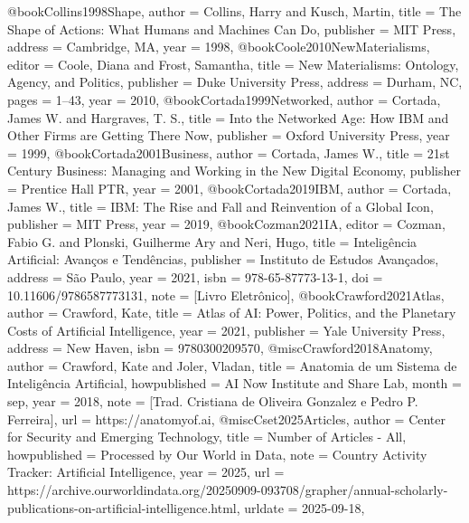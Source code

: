 @book{Collins1998Shape,
  author    = {Collins, Harry and Kusch, Martin},
  title     = {{The Shape of Actions: What Humans and Machines Can Do}},
  publisher = {MIT Press},
  address   = {Cambridge, MA},
  year      = {1998},
}
@book{Coole2010NewMaterialisms,
  editor    = {Coole, Diana and Frost, Samantha},
  title     = {{New Materialisms: Ontology, Agency, and Politics}},
  publisher = {Duke University Press},
  address   = {Durham, NC},
  pages     = {1--43},
  year      = {2010},
}
@book{Cortada1999Networked,
  author    = {Cortada, James W. and Hargraves, T. S.},
  title     = {{Into the Networked Age: How IBM and Other Firms are Getting There Now}},
  publisher = {Oxford University Press},
  year      = {1999},
}
@book{Cortada2001Business,
  author    = {Cortada, James W.},
  title     = {{21st Century Business: Managing and Working in the New Digital Economy}},
  publisher = {Prentice Hall PTR},
  year      = {2001},
}
@book{Cortada2019IBM,
  author    = {Cortada, James W.},
  title     = {{IBM: The Rise and Fall and Reinvention of a Global Icon}},
  publisher = {MIT Press},
  year      = {2019},
}
@book{Cozman2021IA,
  editor    = {Cozman, Fabio G. and Plonski, Guilherme Ary and Neri, Hugo},
  title     = {{Inteligência Artificial: Avanços e Tendências}},
  publisher = {Instituto de Estudos Avançados},
  address   = {São Paulo},
  year      = {2021},
  isbn      = {978-65-87773-13-1},
  doi       = {10.11606/9786587773131},
  note      = {[Livro Eletrônico]},
}
@book{Crawford2021Atlas,
  author    = {Crawford, Kate},
  title     = {{Atlas of AI: Power, Politics, and the Planetary Costs of Artificial Intelligence}},
  year      = {2021},
  publisher = {Yale University Press},
  address   = {New Haven},
  isbn      = {9780300209570},
}
@misc{Crawford2018Anatomy,
  author       = {Crawford, Kate and Joler, Vladan},
  title        = {{Anatomia de um Sistema de Inteligência Artificial}},
  howpublished = {AI Now Institute and Share Lab},
  month        = sep,
  year         = {2018},
  note         = {[Trad. Cristiana de Oliveira Gonzalez e Pedro P. Ferreira]},
  url          = {https://anatomyof.ai},
}
@misc{Cset2025Articles,
  author       = {{Center for Security and Emerging Technology}},
  title        = {{Number of Articles - All}},
  howpublished = {Processed by Our World in Data},
  note         = {Country Activity Tracker: Artificial Intelligence},
  year         = {2025},
  url          = {https://archive.ourworldindata.org/20250909-093708/grapher/annual-scholarly-publications-on-artificial-intelligence.html},
  urldate      = {2025-09-18},
}
